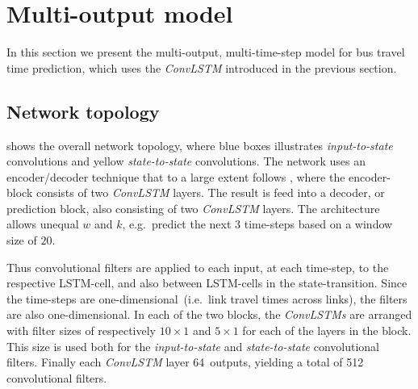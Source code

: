 \documentclass[preprint,11pt,5p,twocolumn]{elsarticle}
\begin{document}

\section{Multi-output model}
\label{sec:model}
In this section we present the multi-output, multi-time-step model for bus travel time prediction, which uses the \emph{ConvLSTM} introduced in the previous section.

\subsection{Network topology}


 shows the overall network topology, where blue boxes illustrates \emph{input-to-state} convolutions and yellow \emph{state-to-state} convolutions. The network uses an encoder/decoder technique that to a large extent follows \cite{ConvLSTM}, where the encoder-block consists of two \emph{ConvLSTM} layers. The result is feed into a decoder, or prediction block, also consisting of two \emph{ConvLSTM} layers. The architecture allows unequal $w$ and $k$, e.g.\ predict the next $3$ time-steps based on a window size of $20$.

Thus convolutional filters are applied to each input, at each time-step, to the respective LSTM-cell, and also between LSTM-cells in the state-transition. Since the time-steps are one-dimensional~(i.e.\ link travel times across links), the filters are also one-dimensional. In each of the two blocks, the \emph{ConvLSTMs} are arranged with filter sizes of respectively $10\times1$ and $5\times1$ for each of the layers in the block. This size is used both for the \emph{input-to-state} and \emph{state-to-state} convolutional filters. Finally each \emph{ConvLSTM} layer 64~outputs, yielding a total of 512 convolutional filters.
\end{document}
